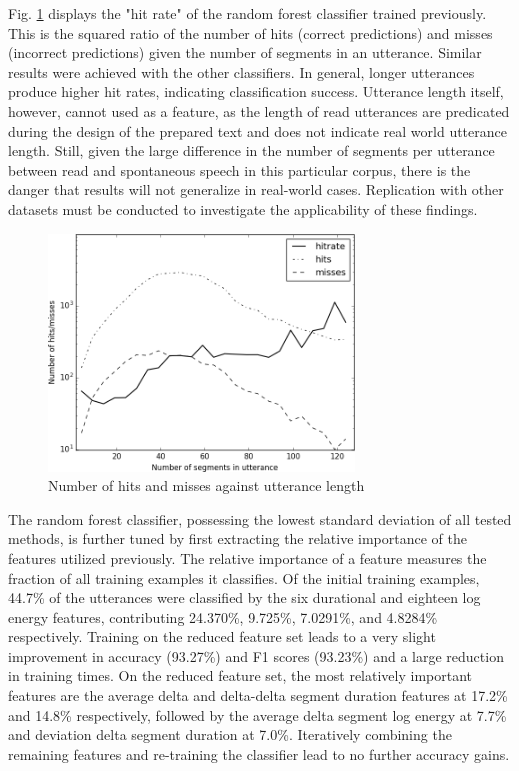 \documentclass[conference]{IEEEtran}
\begin{document}
Fig. \ref{hit_rate} displays the "hit rate" of the random forest classifier trained previously.
This is the squared ratio of the number of hits (correct predictions) and misses (incorrect predictions) given the number of segments in an utterance.
Similar results were achieved with the other classifiers.
In general, longer utterances produce higher hit rates, indicating classification success.
Utterance length itself, however, cannot used as a feature, as the length of read utterances are predicated during the design of the prepared text and does not indicate real world utterance length.
Still, given the large difference in the number of segments per utterance between read and spontaneous speech in this particular corpus, there is the danger that results will not generalize in real-world cases.
Replication with other datasets must be conducted to investigate the applicability of these findings.

\begin{figure}[!htb]
\centering
\includegraphics[width=3.2in]{hitrate}
    \caption{Number of hits and misses against utterance length}
\label{hit_rate}
\end{figure}

The random forest classifier, possessing the lowest standard deviation of all tested methods, is further tuned by first extracting the relative importance of the features utilized previously.
The relative importance of a feature measures the fraction of all training examples it classifies.
Of the initial training examples, 44.7\% of the utterances were classified by the six durational and eighteen log energy features, contributing 24.370\%, 9.725\%, 7.0291\%, and 4.8284\% respectively.
Training on the reduced feature set leads to a very slight improvement in accuracy (93.27\%) and F1 scores (93.23\%) and a large reduction in training times.
On the reduced feature set, the most relatively important features are the average delta and delta-delta segment duration features at 17.2\% and 14.8\% respectively, followed by the average delta segment log energy at 7.7\% and deviation delta segment duration at 7.0\%.
Iteratively combining the remaining features and re-training the classifier lead to no further accuracy gains.
\end{document}
